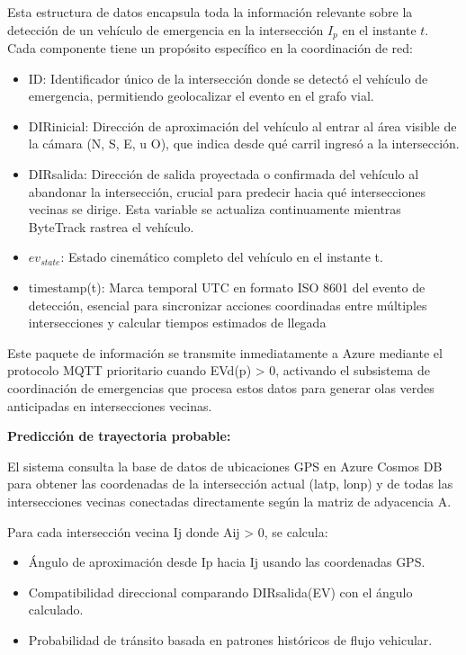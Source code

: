 \documentclass[12pt,a4paper,oneside]{report}
\begin{document}
Esta estructura de datos encapsula toda la información relevante sobre la detección de un vehículo de emergencia en la intersección \(I_{p}\) en el instante \(t\). Cada componente tiene un propósito específico en la coordinación de red:

\begin{itemize}
\item
  ID: Identificador único de la intersección donde se detectó el vehículo de emergencia, permitiendo geolocalizar el evento en el grafo vial.
\item
  DIRinicial: Dirección de aproximación del vehículo al entrar al área visible de la cámara (N, S, E, u O), que indica desde qué carril ingresó a la intersección.
\item
  DIRsalida: Dirección de salida proyectada o confirmada del vehículo al abandonar la intersección, crucial para predecir hacia qué intersecciones vecinas se dirige. Esta variable se actualiza continuamente mientras ByteTrack rastrea el vehículo.
\item
  \(ev_{state}\): Estado cinemático completo del vehículo en el instante t.
\item
  timestamp(t): Marca temporal UTC en formato ISO 8601 del evento de detección, esencial para sincronizar acciones coordinadas entre múltiples intersecciones y calcular tiempos estimados de llegada
\end{itemize}

Este paquete de información se transmite inmediatamente a Azure mediante el protocolo MQTT prioritario cuando EVd(p) \textgreater{} 0, activando el subsistema de coordinación de emergencias que procesa estos datos para generar olas verdes anticipadas en intersecciones vecinas.

\textbf{Predicción de trayectoria probable:}

El sistema consulta la base de datos de ubicaciones GPS en Azure Cosmos DB para obtener las coordenadas de la intersección actual (latp, lonp) y de todas las intersecciones vecinas conectadas directamente según la matriz de adyacencia A.

Para cada intersección vecina Ij donde Aij \textgreater{} 0, se calcula:

\begin{itemize}
\item
  Ángulo de aproximación desde Ip hacia Ij usando las coordenadas GPS.
\item
  Compatibilidad direccional comparando DIRsalida(EV) con el ángulo calculado.
\item
  Probabilidad de tránsito basada en patrones históricos de flujo vehicular.
\end{itemize}
\end{document}

